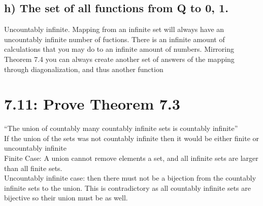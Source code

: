 \documentclass{article}
\begin{document}
\subsection*{h) The set of all functions from Q to {0, 1}.}
Uncountably infinite. Mapping from an infinite set will always have an uncountably infinite number of fuctions. There is an infinite amount of calculations that you may do to an infinite amount of numbers. Mirroring Theorem 7.4 you can always create another set of answers of the mapping through diagonalization, and thus another function
\section*{7.11: Prove Theorem 7.3}
``The union of countably many countably infinite sets is countably infinite'' \\
If the union of the sets was not countably infinite then it would be either finite or uncountably infinite \\
Finite Case: A union cannot remove elements a set, and all infinite sets are larger than all finite sets.\\
Uncountably infinite case: then there must not be a bijection from the countably infinite sets to the union. This is contradictory as all countably infinite sets are bijective so their union must be as well.
\end{document}
